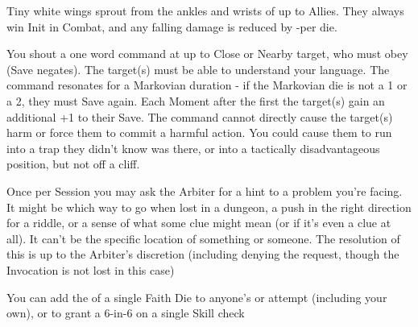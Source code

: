 {\LITURGY [
  Name= Duelists' Wings,
  Link=grey-lords-liturgy-duelists-wings,
  Paradigm= Biomancy ,
  Save=  0 ,
  Duration= Combat / \SUMDICE Minutes ,
  Counter=  n/a  ,
  Keywords= Splittable ,
  Target=   Close (touch) Allies or Self
]



Tiny white wings sprout from the ankles and wrists of up to \DICE Allies.  They always win Init in Combat, and any falling damage is reduced by -\DICE per die.

\LITURGY [
  Name= Resonating Command,
  Link=grey-lords-liturgy-resonating command,
  Paradigm= Mind ,
  Save=  Y (negates) ,
  Duration= Markovian ,
  Counter=  n/a  ,
  Keywords= Splittable ,
  Target=   Nearby creatures
]



You shout a one word command at up to \DICE Close or Nearby target, who must obey (Save negates).  The target(s) must be able to understand your language.  The command resonates for a Markovian duration - if the Markovian die is not a 1 or a 2, they must Save again.  Each Moment after the first the target(s) gain an additional +1 to their Save.  The command cannot directly cause the target(s) harm or force them to commit a harmful action.  You could cause them to run into a trap they didn't know was there, or into a tactically disadvantageous position, but not off a cliff.


\GOD[
Name=The Muses,
Link=small-god-the muses,
GodOf=Gods of Inspiration,
Holy=a nine-pointed star worn as an amulet or inscribed on a headband
]


Once per Session you may ask the Arbiter for a hint to a problem you're facing. It might be which way to go when lost in a dungeon, a push in the right direction for a riddle, or a sense of what some clue might mean (or if it's even a clue at all). It can't be the specific location of something or someone. The resolution of this is  up to the Arbiter's discretion (including denying the request, though the Invocation is not lost in this case)


You can add the \SUMDICE of a single Faith Die to anyone's \RO or \RB attempt (including your own), or to grant a 6-in-6 on a single Skill check





\GOD[
Name=Thoth,
Link=small-god-thoth,
GodOf=God of Knowledge,
Holy=a small book of scripture
]

}
